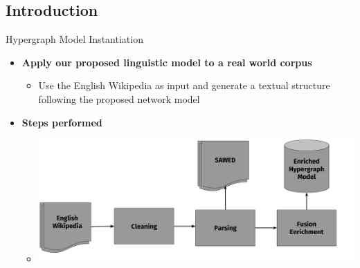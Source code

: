 \documentclass[10pt,=table]{beamer}
\begin{document}
\subsection{Introduction}
\begin{frame}{Hypergraph Model Instantiation}
\begin{itemize}
\item<1-> \large \textbf{Apply our proposed linguistic model to a real world corpus}
	\begin{itemize}
	\item<1-> Use the English Wikipedia as input and generate a textual structure following the proposed network model
	\end{itemize}
\item<2-> \large \textbf{Steps performed}	
\begin{itemize}
	\item<2->[] \begin{center}
		\includegraphics[width=\linewidth]{image2/Chapitre7/saewd}
		\end{center}

\end{itemize}

\end{itemize}

\end{frame} 
\end{document}
